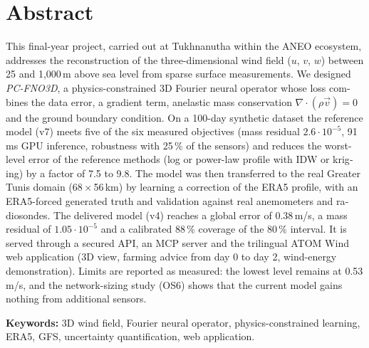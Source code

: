 \chapter*{Abstract}
\begin{otherlanguage}{english}
This final-year project, carried out at Tukhnanutha within the ANEO ecosystem, addresses the
reconstruction of the three-dimensional wind field ($u$, $v$, $w$) between 25 and 1,000\,m above
sea level from sparse surface measurements. We designed \emph{PC-FNO3D}, a physics-constrained 3D
Fourier neural operator whose loss combines the data error, a gradient term, anelastic mass
conservation $\nabla\cdot(\rho\vec{v})=0$ and the ground boundary condition. On a 100-day synthetic
dataset the reference model (v7) meets five of the six measured objectives (mass residual
$2.6\cdot10^{-5}$, 91\,ms GPU inference, robustness with 25\,\% of the sensors) and reduces the
worst-level error of the reference methods (log or power-law profile with IDW or kriging) by a
factor of 7.5 to 9.8. The model was then transferred to the real Greater Tunis domain
(68\,$\times$\,56\,km) by learning a correction of the ERA5 profile, with an ERA5-forced generated
truth and validation against real anemometers and radiosondes. The delivered model (v4) reaches a
global error of 0.38\,m/s, a mass residual of $1.05\cdot10^{-5}$ and a calibrated 88\,\% coverage
of the 80\,\% interval. It is served through a secured API, an MCP server and the trilingual ATOM
Wind web application (3D view, farming advice from day 0 to day 2, wind-energy demonstration).
Limits are reported as measured: the lowest level remains at 0.53\,m/s, and the network-sizing
study (OS6) shows that the current model gains nothing from additional sensors.

\noindent\textbf{Keywords:} 3D wind field, Fourier neural operator, physics-constrained learning,
ERA5, GFS, uncertainty quantification, web application.
\end{otherlanguage}
